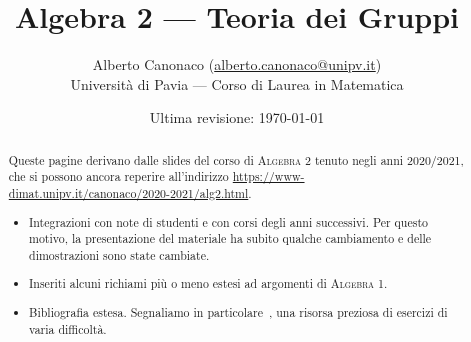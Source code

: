 


\title{Algebra 2 --- Teoria dei Gruppi}
\author{Alberto Canonaco (\url{alberto.canonaco@unipv.it}) \\ Università di Pavia --- Corso di Laurea in Matematica}
\date{Ultima revisione: \today}




\maketitle

\begin{abstract}
Queste pagine derivano dalle \textenglish{slides} del corso di {\scshape Algebra 2} tenuto negli anni 2020/2021, che si possono ancora reperire all'indirizzo \url{https://www-dimat.unipv.it/canonaco/2020-2021/alg2.html}.
\begin{itemize}[leftmargin=*]
\item Integrazioni con note di studenti e con corsi degli anni successivi. Per questo motivo, la presentazione del materiale ha subito qualche cambiamento e delle dimostrazioni sono state cambiate.
\item Inseriti alcuni richiami più o meno estesi ad argomenti di {\scshape Algebra 1}.
\item Bibliografia estesa. Segnaliamo in particolare~\cite{tsumura:exercises}, una risorsa preziosa di esercizi di varia difficoltà.
\end{itemize}
\end{abstract}

\printbibliography[title=Testi di riferimento]

\tableofcontents














